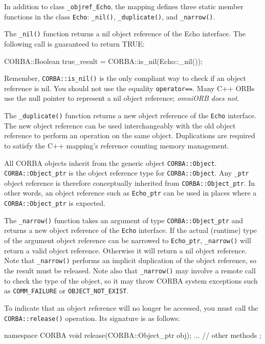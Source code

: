 \documentclass[11pt,twoside,a4paper]{book}
\newcommand{\type}[1]{\texttt{#1}}
\newcommand{\intf}[1]{\texttt{#1}}
\newcommand{\code}[1]{\texttt{#1}}
\newcommand{\op}[1]{\texttt{#1()}}
\newcommand{\dsc}{\discretionary{}{}{}}
\begin{document}
In addition to class \type{\_objref\_Echo}, the mapping defines three
static member functions in the class \type{Echo}: \op{\_nil},
\op{\_duplicate}, and \op{\_narrow}.

The \op{\_nil} function returns a nil object reference of the Echo
interface. The following call is guaranteed to return TRUE:

\begin{cxxlisting}
CORBA::Boolean true_result = CORBA::is_nil(Echo::_nil());
\end{cxxlisting}

Remember, \op{CORBA::is\_nil} is the only compliant way to check if an
object reference is nil. You should not use the equality
\code{operator==}. Many C++ ORBs use the null pointer to represent a
nil object reference; \emph{omniORB does not}.

The \op{\_duplicate} function returns a new object reference of the
\intf{Echo} interface. The new object reference can be used
interchangeably with the old object reference to perform an operation
on the same object. Duplications are required to satisfy the C++
mapping's reference counting memory management.

All CORBA objects inherit from the generic object
\type{CORBA::Object}.  \type{CORBA::\dsc{}Object\_ptr} is the object
reference type for \type{CORBA::Object}.  Any \type{\_ptr} object
reference is therefore conceptually inherited from
\type{CORBA::Object\_ptr}. In other words, an object reference such as
\type{Echo\_ptr} can be used in places where a
\type{CORBA::Object\_ptr} is expected.

The \op{\_narrow} function takes an argument of type
\type{CORBA::Object\_ptr} and returns a new object reference of the
\intf{Echo} interface.  If the actual (runtime) type of the argument
object reference can be narrowed to \type{Echo\_ptr}, \op{\_narrow}
will return a valid object reference. Otherwise it will return a nil
object reference. Note that \op{\_narrow} performs an implicit
duplication of the object reference, so the result must be released.
Note also that \op{\_narrow} may involve a remote call to check the
type of the object, so it may throw CORBA system exceptions such as
\code{COMM\_FAILURE} or \code{OBJECT\_NOT\_EXIST}.

To indicate that an object reference will no longer be accessed, you
must call the \op{CORBA::release} operation. Its signature is as
follows:

\begin{cxxlisting}
namespace CORBA {
  void release(CORBA::Object_ptr obj);
  ... // other methods
};
\end{cxxlisting}
\end{document}
